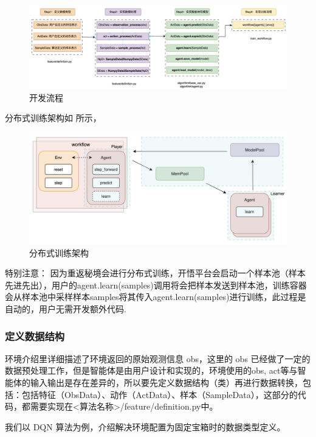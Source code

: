 \begin{figure}[H]
    \centering
    \includegraphics[width=1\linewidth]{pic/dev-process-1.png}
    \caption{ 开发流程}
    \label{dev-process-1}
\end{figure}

分布式训练架构如  所示，

\begin{figure}[H]
    \centering
    \includegraphics[width=1\linewidth]{pic/train.png}
    \caption{ 分布式训练架构}
    \label{train}
\end{figure}

特别注意： 因为重返秘境会进行分布式训练，开悟平台会启动一个样本池（样本先进先出），用户的agent.learn(samples)调用将会把样本发送到样本池，训练容器会从样本池中采样样本samples将其传入agent.learn(samples)进行训练，此过程是自动的，用户无需开发额外代码.

\subsubsection{定义数据结构}

环境介绍里详细描述了环境返回的原始观测信息 obs，这里的 obs 已经做了一定的数据预处理工作，但是智能体是由用户设计和实现的，环境使用的obs, act等与智能体的输入输出是存在差异的，所以要先定义数据结构（类）再进行数据转换，包括：包括特征（ObsData）、动作（ActData）、样本（SampleData），这部分的代码，都需要实现在<算法名称>/feature/definition.py中。

我们以 DQN 算法为例，介绍解决环境配置为固定宝箱时的数据类型定义。

